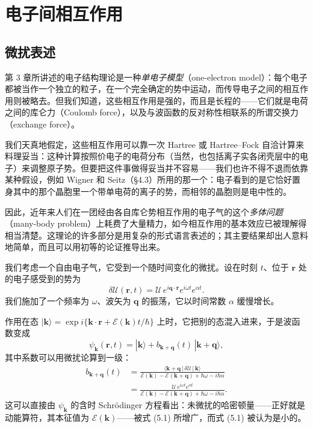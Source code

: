 \chapter{电子间相互作用}


\section{微扰表述}

第 3 章所讲述的电子结构理论是一种\emph{单电子模型}（one-electron model）：每个电子都被当作一个独立的粒子，在一个完全确定的势中运动，而传导电子之间的相互作用则被略去。但我们知道，这些相互作用是强的，而且是长程的——它们就是电荷之间的库仑力（Coulomb force），以及与波函数的反对称性相联系的所谓交换力（exchange force）。

我们天真地假定，这些相互作用可以靠一次 Hartree 或 Hartree--Fock 自洽计算来料理妥当：这种计算按照价电子的电荷分布（当然，也包括离子实各闭壳层中的电子）来调整原子势。但要把这件事做得妥当并不容易——我们也许不得不退而依靠某种假设，例如 Wigner 和 Seitz（§4.3）所用的那一个：电子看到的是它恰好置身其中的那个晶胞里一个带单电荷的离子的势，而相邻的晶胞则是电中性的。

因此，近年来人们在一团经由各自库仑势相互作用的电子气的这个\emph{多体问题}（many-body problem）上耗费了大量精力，如今相互作用的基本效应已被理解得相当清楚。这理论的许多部分是用复杂的形式语言表述的；其主要结果却出人意料地简单，而且可以用初等的论证推导出来。

我们考虑一个自由电子气，它受到一个随时间变化的微扰。设在时刻 $t$、位于 $\mathbf{r}$ 处的电子感受到的势为
\begin{equation*}
\delta\mathcal{U}(\mathbf{r},t)=\mathcal{U}\,e^{i\mathbf{q}\cdot\mathbf{r}}e^{i\omega t}e^{\alpha t}.
\tag{5.1}
\end{equation*}
我们施加了一个频率为 $\omega$、波矢为 $\mathbf{q}$ 的振荡，它以时间常数 $\alpha$ 缓慢增长。

作用在态 $|\mathbf{k}\rangle=\exp i\{\mathbf{k}\cdot\mathbf{r}+\mathcal{E}(\mathbf{k})t/\hbar\}$ 上时，它把别的态混入进来，于是波函数变成
\begin{equation*}
\psi_{\mathbf{k}}(\mathbf{r},t)=|\mathbf{k}\rangle+b_{\mathbf{k}+\mathbf{q}}(t)\,|\mathbf{k}+\mathbf{q}\rangle,
\tag{5.2}
\end{equation*}
其中系数可以用微扰论算到一级：
\begin{align*}
b_{\mathbf{k}+\mathbf{q}}(t)&=\frac{\langle\mathbf{k}+\mathbf{q}\,|\,\delta\mathcal{U}\,|\,\mathbf{k}\rangle}{\mathcal{E}(\mathbf{k})-\mathcal{E}(\mathbf{k}+\mathbf{q})+\hbar\omega-i\hbar\alpha}\\
&=\frac{\mathcal{U}\,e^{i\omega t}e^{\alpha t}}{\mathcal{E}(\mathbf{k})-\mathcal{E}(\mathbf{k}+\mathbf{q})+\hbar\omega-i\hbar\alpha}.
\tag{5.3}
\end{align*}
这可以直接由 $\psi_{\mathbf{k}}$ 的含时 Schrödinger 方程看出：未微扰的哈密顿量——正好就是动能算符，其本征值为 $\mathcal{E}(\mathbf{k})$——被式 (5.1) 所增广，而式 (5.1) 被认为是小的。

